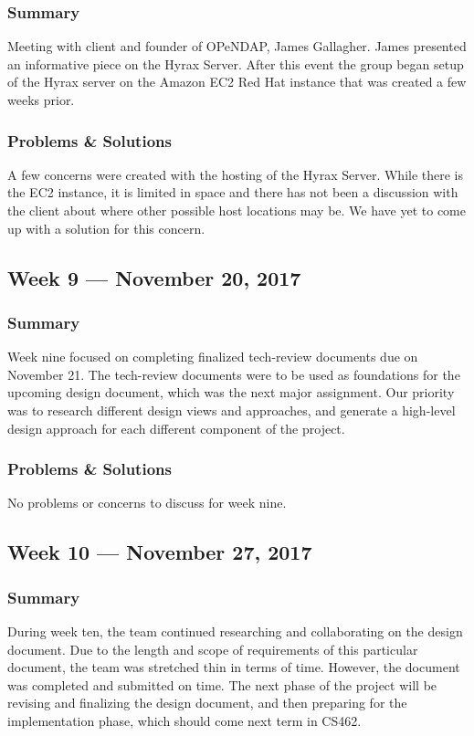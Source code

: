 \documentclass[onecolumn, draftclsnofoot,10pt, compsoc]{IEEEtran}
\begin{document}
\subsubsection{Summary}
Meeting with client and founder of OPeNDAP, James Gallagher. James presented an informative piece on the Hyrax Server. After this event the group began setup of the Hyrax server on the Amazon EC2 Red Hat instance that was created a few weeks prior.

\subsubsection{Problems \& Solutions}
A few concerns were created with the hosting of the Hyrax Server. While there is the EC2 instance, it is limited in space and there has not been a discussion with the client about where other possible host locations may be. We have yet to come up with a solution for this concern.

\subsection{Week 9 --- November 20, 2017}
\subsubsection{Summary}
Week nine focused on completing finalized tech-review documents due on November 21. The tech-review documents were to be used as foundations for the upcoming design document, which was the next major assignment. Our priority was to research different design views and approaches, and generate a high-level design approach for each different component of the project. 
\subsubsection{Problems \& Solutions}
No problems or concerns to discuss for week nine.

\subsection{Week 10 --- November 27, 2017}
\subsubsection{Summary}
During week ten, the team continued researching and collaborating on the design document. Due to the length and scope of requirements of this particular document, the team was stretched thin in terms of time. However, the document was completed and submitted on time. The next phase of the project will be revising and finalizing the design document, and then preparing for the implementation phase, which should come next term in CS462.
\end{document}
